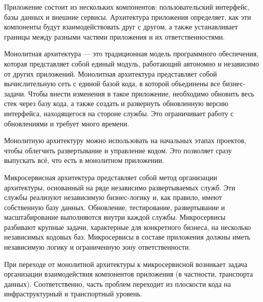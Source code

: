 Приложение состоит из нескольких компонентов: пользовательский интерфейс, базы данных и внешние сервисы. Архитектура приложения определяет, как эти компоненты будут взаимодействовать друг с другом, а также устанавливает границы между разными частями приложения и их ответственностями.


Монолитная архитектура --- это традиционная модель программного обеспечения, которая представляет собой единый модуль, работающий автономно и независимо от других приложений. 
Монолитная архитектура представляет собой вычислительную сеть с единой базой кода, в которой объединены все бизнес-задачи. Чтобы внести изменения в такое приложение, необходимо обновить весь стек через базу кода, а также создать и развернуть обновленную версию интерфейса, находящегося на стороне службы. Это ограничивает работу с обновлениями и требует много времени.

Монолитную архитектуру можно использовать на начальных этапах проектов, чтобы облегчить развертывание и управление кодом. Это позволяет сразу выпускать всё, что есть в монолитном приложении.


Микросервисная архитектура представляет собой метод организации архитектуры, основанный на ряде независимо развертываемых служб. Эти службы реализуют независимую бизнес-логику и, как правило, имеют собственную базу данных. Обновление, тестирование, развертывание и масштабирование выполняются внутри каждой службы. Микросервисы разбивают крупные задачи, характерные для конкретного бизнеса, на несколько независимых кодовых баз. Микросервисы в составе приложения должны иметь независимую логику и ограниченную зону ответственности.


При переходе от монолитной архитектуры к микросервисной возникает задача организации взаимодействия компонентов приложения (в частности, транспорта данных). Соответственно, часть проблем переходит из плоскости кода на инфраструктурный и транспортный уровень.


